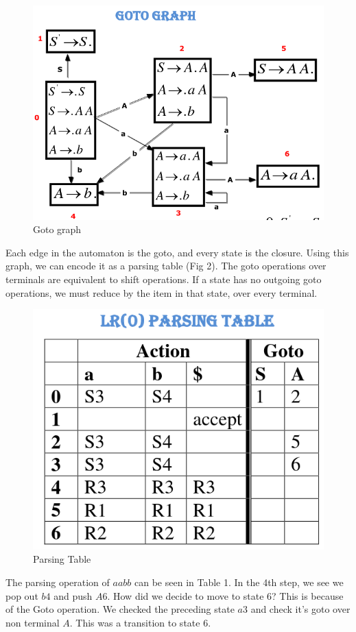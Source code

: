 \documentclass[12pt,letterpaper]{amsbook}
\theoremstyle{definition}
\begin{document}
\begin{figure}[htpb]
  \centering
  \includegraphics[width=0.8\linewidth]{./assets/goto_graph_example.png}
  \caption{Goto graph}%
  \label{fig:}
\end{figure}

Each edge in the automaton is the goto, and every state is the closure. Using this graph, we can encode it as a parsing table (Fig 2). The goto operations over terminals are equivalent to shift operations. If a state has no outgoing goto operations, we must reduce by the item in that state, over every terminal.

\begin{figure}[htpb]
  \centering
  \includegraphics[width=0.6\linewidth]{./assets/lr0_parsing_table_example.png}
  \caption{Parsing Table}%
  \label{fig:./assets}
\end{figure}

The parsing operation of $aabb$ can be seen in Table 1. In the 4th step, we see we pop out $b4$ and push $A6$. How did we decide to move to state 6? This is because of the Goto operation. We checked the preceding state $a3$ and check it's goto over non terminal $A$. This was a transition to state 6.
\end{document}
